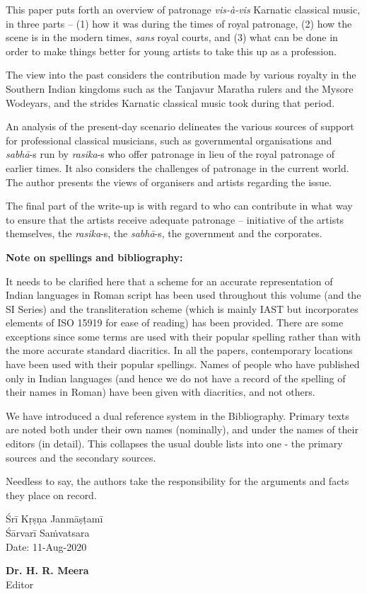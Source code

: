 This paper puts forth an overview of patronage \textit{vis-à-vis} Karnatic classical music, in three parts – (1) how it was during the times of royal patronage, (2) how the scene is in the modern times, \textit{sans} royal courts, and (3) what can be done in order to make things better for young artists to take this up as a profession.

The view into the past considers the contribution made by various royalty in the Southern Indian kingdoms such as the Tanjavur Maratha rulers and the Mysore Wodeyars, and the strides Karnatic classical music took during that period.

An analysis of the present-day scenario delineates the various sources of support for professional classical musicians, such as governmental organisations and \textit{sabhā}-s run by \textit{rasika}-s who offer patronage in lieu of the royal patronage of earlier times. It also considers the challenges of patronage in the current world. The author presents the views of organisers and artists regarding the issue.

The final part of the write-up is with regard to who can contribute in what way to ensure that the artists receive adequate patronage – initiative of the artists themselves, the \textit{rasika}-s, the \textit{sabhā}-s, the government and the corporates.

\delimiter

\textbf{Note on spellings and bibliography: }

It needs to be clarified here that a scheme for an accurate representation of Indian languages in Roman script has been used throughout this volume (and the SI Series) and the transliteration scheme (which is mainly IAST but incorporates elements of ISO 15919 for ease of reading) has been provided. There are some exceptions since some terms are used with their popular spelling rather than with the more accurate standard diacritics. In all the papers, contemporary locations have been used with their popular spellings. Names of people who have published only in Indian languages (and hence we do not have a record of the spelling of their names in Roman) have been given with diacritics, and not others.

We have introduced a dual reference system in the Bibliography. Primary texts are noted both under their own names (nominally), and under the names of their editors (in detail). This collapses the usual double lists into one - the primary sources and the secondary sources.

Needless to say, the authors take the responsibility for the arguments and facts they place on record.

\vspace{.2cm}

Śrī Kṛṣṇa Janmāṣṭamī\\ Śārvarī Saṁvatsara\\ Date: 11-Aug-2020

\vspace{-1.83cm}

\begin{flushright}
\textbf{Dr. H. R. Meera}\\ Editor
\end{flushright}

\theendnotes

